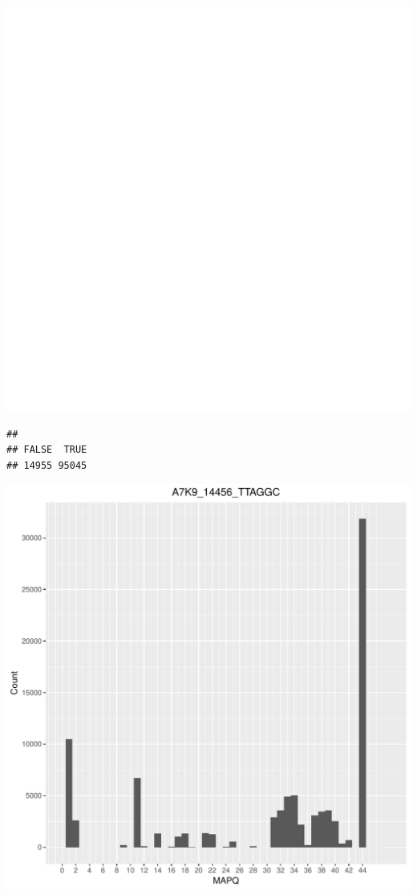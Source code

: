 \documentclass[12pt, a4paper]{article}\usepackage[]{graphicx}\usepackage[]{color}
\makeatletter
\def\maxwidth{ %
  \ifdim\Gin@nat@width>\linewidth
    \linewidth
  \else
    \Gin@nat@width
  \fi
}
\newenvironment{kframe}{%
 \def\at@end@of@kframe{}%
 \ifinner\ifhmode%
  \def\at@end@of@kframe{\end{minipage}}%
  \begin{minipage}{\columnwidth}%
 \fi\fi%
 \def\FrameCommand##1{\hskip\@totalleftmargin \hskip-\fboxsep
 \colorbox{shadecolor}{##1}\hskip-\fboxsep
     \hskip-\linewidth \hskip-\@totalleftmargin \hskip\columnwidth}%
 \MakeFramed {\advance\hsize-\width
   \@totalleftmargin\z@ \linewidth\hsize
   \@setminipage}}%
 {\par\unskip\endMakeFramed%
 \at@end@of@kframe}
\newenvironment{knitrout}{}{} %
\makeatother
\begin{document}
\begin{knitrout}
\includegraphics[width=\maxwidth]{figure/unnamed-chunk-3-20} 
\begin{kframe}\begin{verbatim}
## 
## FALSE  TRUE 
## 14955 95045
\end{verbatim}
\end{kframe}
\includegraphics[width=\maxwidth]{figure/unnamed-chunk-3-21} 


\end{knitrout}
\end{document}
